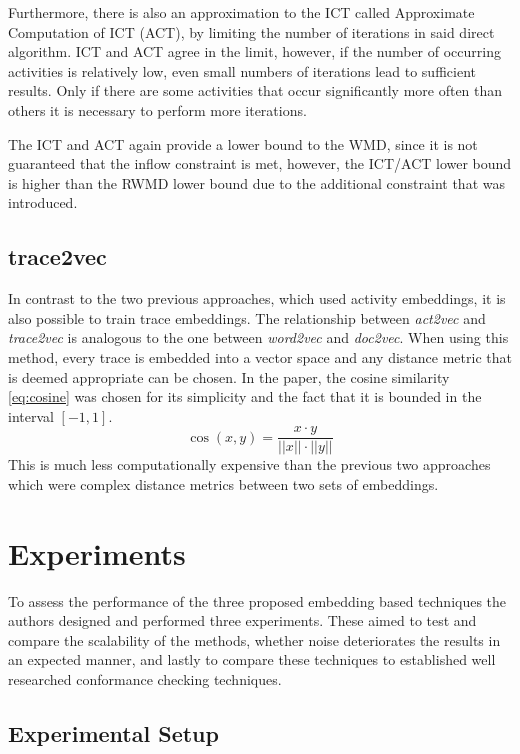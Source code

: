 \documentclass[runningheads]{template/llncs}
\begin{document}
Furthermore, there is also an approximation to the ICT called Approximate Computation of ICT (ACT), by limiting the number of iterations in said direct algorithm.
ICT and ACT agree in the limit, however, if the number of occurring activities is relatively low, even small numbers of iterations lead to sufficient results.
Only if there are some activities that occur significantly more often than others it is necessary to perform more iterations.

The ICT and ACT again provide a lower bound to the WMD, since it is not guaranteed that the inflow constraint is met, however, the ICT/ACT lower bound is higher than the RWMD lower bound due to the additional constraint that was introduced.
\color{black}
\subsection{trace2vec}
In contrast to the two previous approaches, which used activity embeddings, it is also possible to train trace embeddings.
The relationship between \emph{act2vec} and \emph{trace2vec} is analogous to the one between \emph{word2vec} and \emph{doc2vec}.
When using this method, every trace is embedded into a vector space and any distance metric that is deemed appropriate can be chosen.
In the paper, the cosine similarity \cref{eq:cosine} was chosen for its simplicity and the fact that it is bounded in the interval $[-1,1]$.
\begin{equation}
	\cos(x,  y) = \frac { x \cdot  y}{|| x|| \cdot || y||}
	\label{eq:cosine}
\end{equation}
This is much less computationally expensive than the previous two approaches which were complex distance metrics between two sets of embeddings.

\section{Experiments}
\label{sec:results}
To assess the performance of the three proposed embedding based techniques the authors designed and performed three experiments.
These aimed to test and compare the scalability of the methods, whether noise deteriorates the results in an expected manner, and lastly to compare these techniques to established well researched conformance checking techniques.

\subsection{Experimental Setup}
\end{document}
